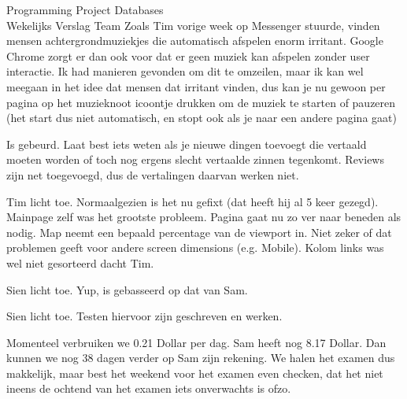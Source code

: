 \documentclass{article}
\newcounter{team}
\begin{document}
\begin{Minutes}{Programming Project Databases \\ Wekelijks Verslag Team }
        Zoals Tim vorige week op Messenger stuurde, vinden mensen achtergrondmuziekjes die automatisch afspelen enorm irritant. Google Chrome zorgt er dan ook voor dat er geen muziek kan afspelen zonder user interactie. Ik had manieren gevonden om dit te omzeilen, maar ik kan wel meegaan in het idee dat mensen dat irritant vinden, dus kan je nu gewoon per pagina op het muzieknoot icoontje drukken om de muziek te starten of pauzeren (het start dus niet automatisch, en stopt ook als je naar een andere pagina gaat)

        Is gebeurd. Laat best iets weten als je nieuwe dingen toevoegt die vertaald moeten worden of toch nog ergens slecht vertaalde zinnen tegenkomt. Reviews zijn net toegevoegd, dus de vertalingen daarvan werken niet.

        Tim licht toe. Normaalgezien is het nu gefixt (dat heeft hij al 5 keer gezegd). Mainpage zelf was het grootste probleem. Pagina gaat nu zo ver naar beneden als nodig. Map neemt een bepaald percentage van de viewport in. Niet zeker of dat problemen geeft voor andere screen dimensions (e.g. Mobile). Kolom links was wel niet gesorteerd dacht Tim.

        Sien licht toe. Yup, is gebasseerd op dat van Sam.

        Sien licht toe. Testen hiervoor zijn geschreven en werken.

        Momenteel verbruiken we 0.21 Dollar per dag. Sam heeft nog 8.17 Dollar. Dan kunnen we nog 38 dagen verder op Sam zijn rekening. We halen het examen dus makkelijk, maar best het weekend voor het examen even checken, dat het niet ineens de ochtend van het examen iets onverwachts is ofzo.




\end{Minutes}
\end{document}
